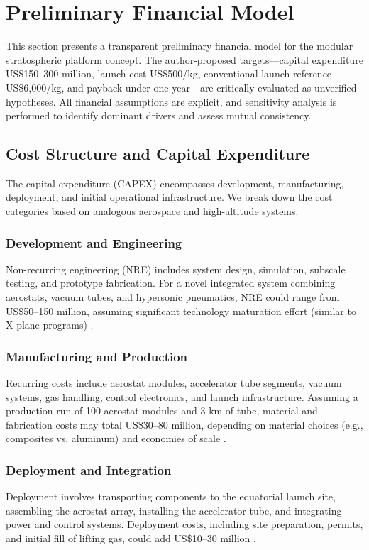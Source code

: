 \section{Preliminary Financial Model}
\label{sec:financial}

This section presents a transparent preliminary financial model for the modular stratospheric platform concept. The author-proposed targets—capital expenditure US\$150–300 million, launch cost US\$500/kg, conventional launch reference US\$6,000/kg, and payback under one year—are critically evaluated as unverified hypotheses. All financial assumptions are explicit, and sensitivity analysis is performed to identify dominant drivers and assess mutual consistency.

\subsection{Cost Structure and Capital Expenditure}
The capital expenditure (CAPEX) encompasses development, manufacturing, deployment, and initial operational infrastructure. We break down the cost categories based on analogous aerospace and high-altitude systems.

\subsubsection{Development and Engineering}
Non-recurring engineering (NRE) includes system design, simulation, subscale testing, and prototype fabrication. For a novel integrated system combining aerostats, vacuum tubes, and hypersonic pneumatics, NRE could range from US\$50–150 million, assuming significant technology maturation effort (similar to X-plane programs) \cite{nasa_cost_handbook}.

\subsubsection{Manufacturing and Production}
Recurring costs include aerostat modules, accelerator tube segments, vacuum systems, gas handling, control electronics, and launch infrastructure. Assuming a production run of 100 aerostat modules and 3 km of tube, material and fabrication costs may total US\$30–80 million, depending on material choices (e.g., composites vs. aluminum) and economies of scale \cite{aerospace_cost_manual}.

\subsubsection{Deployment and Integration}
Deployment involves transporting components to the equatorial launch site, assembling the aerostat array, installing the accelerator tube, and integrating power and control systems. Deployment costs, including site preparation, permits, and initial fill of lifting gas, could add US\$10–30 million \cite{faa_commercial_space}.


